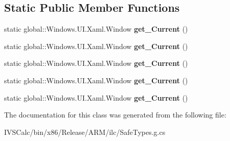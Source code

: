 \subsection*{Static Public Member Functions}
\begin{DoxyCompactItemize}
\item 
\mbox{\label{class_windows_1_1_u_i_1_1_xaml_1_1_window_a47909eee66905f60d42dbe54f722cbad}} 
static global\+::\+Windows.\+U\+I.\+Xaml.\+Window {\bfseries get\+\_\+\+Current} ()
\item 
\mbox{\label{class_windows_1_1_u_i_1_1_xaml_1_1_window_a47909eee66905f60d42dbe54f722cbad}} 
static global\+::\+Windows.\+U\+I.\+Xaml.\+Window {\bfseries get\+\_\+\+Current} ()
\item 
\mbox{\label{class_windows_1_1_u_i_1_1_xaml_1_1_window_a47909eee66905f60d42dbe54f722cbad}} 
static global\+::\+Windows.\+U\+I.\+Xaml.\+Window {\bfseries get\+\_\+\+Current} ()
\item 
\mbox{\label{class_windows_1_1_u_i_1_1_xaml_1_1_window_a47909eee66905f60d42dbe54f722cbad}} 
static global\+::\+Windows.\+U\+I.\+Xaml.\+Window {\bfseries get\+\_\+\+Current} ()
\item 
\mbox{\label{class_windows_1_1_u_i_1_1_xaml_1_1_window_a47909eee66905f60d42dbe54f722cbad}} 
static global\+::\+Windows.\+U\+I.\+Xaml.\+Window {\bfseries get\+\_\+\+Current} ()
\end{DoxyCompactItemize}


The documentation for this class was generated from the following file\+:\begin{DoxyCompactItemize}
\item 
I\+V\+S\+Calc/bin/x86/\+Release/\+A\+R\+M/ilc/Safe\+Types.\+g.\+cs\end{DoxyCompactItemize}
